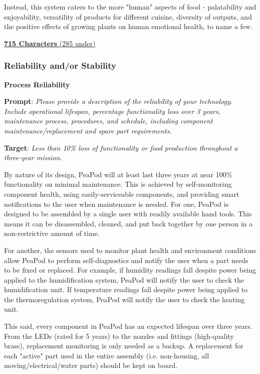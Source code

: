 \documentclass{report}
\begin{document}
Instead, this system caters to the more "human" aspects of food - palatability and enjoyability, versatility of products for different cuisine, diversity of outputs, and the positive effects of growing plants on human emotional health, to name a few.

\uline{\textbf{715 Characters} (285 under)}

\subsubsection{Reliability and/or Stability}

\textbf{Process Reliability}
\label{sec:reliability-process}

\textbf{Prompt}: \textit{Please provide a description of the reliability of your technology. Include operational lifespan, percentage functionality loss over 3 years, maintenance process, procedures, and schedule, including component maintenance/replacement and spare part requirements.}

\textbf{Target}: \textit{Less than 10\% loss of functionality or food production throughout a three-year mission.}


By nature of its design, PeaPod will at least last three years at near 100\% functionality on minimal maintenance. This is achieved by self-monitoring component health, using easily-serviceable components, and providing smart notifications to the user when maintenance is needed.
For one, PeaPod is designed to be assembled by a single user with readily available hand tools. This means it can be disassembled, cleaned, and put back together by one person in a non-restrictive amount of time.

For another, the sensors used to monitor plant health and environment conditions allow PeaPod to perform self-diagnostics and notify the user when a part needs to be fixed or replaced. For example, if humidity readings fall despite power being applied to the humidification system, PeaPod will notify the user to check the humidification unit. If temperature readings fall despite power being applied to the thermoregulation system, PeaPod will notify the user to check the heating unit.

This said, every component in PeaPod has an expected lifespan over three years. From the LEDs (rated for 5 years) to the nozzles and fittings (high-quality brass), replacement monitoring is only needed as a backup. A replacement for each "active" part used in the entire assembly (i.e. non-housing, all moving/electrical/water parts) should be kept on board.
\end{document}

